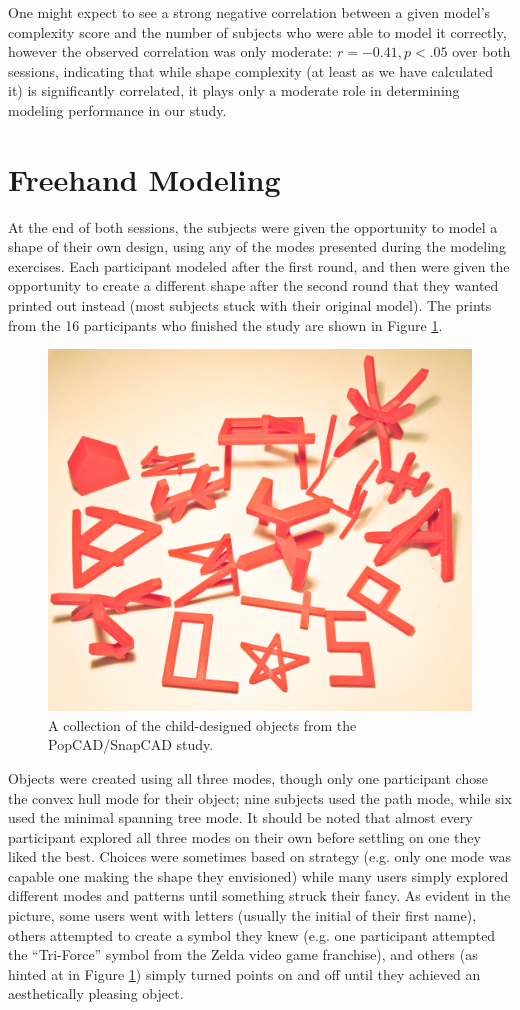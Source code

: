 One might expect to see a strong negative correlation between a given model's
complexity score and the number of subjects who were able to model it correctly,
however the observed correlation was only moderate: $r = -0.41, p < .05$ over
both sessions, indicating that while shape complexity (at least as we have
calculated it) is significantly correlated, it plays only a moderate role in
determining modeling performance in our study.


\section{Freehand Modeling}

At the end of both sessions, the subjects were given the opportunity to model a
shape of their own design, using any of the modes presented during the modeling
exercises. Each participant modeled after the first round, and then were given
the opportunity to create a different shape after the second round that they
wanted printed out instead (most subjects stuck with their original model). The
prints from the 16 participants who finished the study are shown in Figure
\ref{UserShapesAll}.

\begin{figure}[!ht]
\begin{center}
\includegraphics[width=.55\linewidth]{images/userShapesAll} 
\end{center}
\caption{A collection of the child-designed objects from the PopCAD/SnapCAD
study.}
\label{UserShapesAll}
\end{figure}

Objects were created using all three modes, though only one participant chose
the convex hull mode for their object; nine subjects used the path mode, while
six used the minimal spanning tree mode. It should be noted that almost every
participant explored all three modes on their own before settling on one they
liked the best. Choices were sometimes based on strategy (e.g. only one mode was
capable one making the shape they envisioned) while many users simply explored
different modes and patterns until something struck their fancy.
As evident in the picture, some users went with letters (usually the initial of
their first name), others attempted to create a symbol they knew (e.g. one
participant attempted the ``Tri-Force'' symbol from the Zelda video game
franchise), and others (as hinted at in Figure \ref{UserShapesAll}) simply
turned points on and off until they achieved an aesthetically pleasing object.

